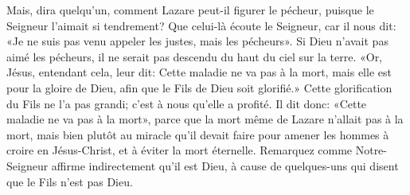 Mais, dira quelqu’un, comment Lazare peut-il figurer le pécheur,
	puisque le Seigneur l’aimait si tendrement?
Que celui-là écoute le Seigneur, car il nous dit:
	«Je ne suis pas venu appeler les justes, mais les pécheurs».
Si Dieu n’avait pas aimé les pécheurs,
	il ne serait pas descendu du haut du ciel sur la terre.
«Or, Jésus, entendant cela, leur dit:
	Cette maladie ne va pas à la mort, mais elle est pour la gloire de Dieu,
	afin que le Fils de Dieu soit glorifié.»
Cette glorification du Fils ne l’a pas grandi;
	c’est à nous qu’elle a profité.
Il dit donc: «Cette maladie ne va pas à la mort»,
	parce que la mort même de Lazare n’allait pas à la mort,
	mais bien plutôt au miracle qu’il devait faire
		pour amener les hommes à croire en Jésus-Christ,
	et à éviter la mort éternelle.
Remarquez comme Notre-Seigneur affirme indirectement qu’il est Dieu,
	à cause de quelques-uns qui disent que le Fils n’est pas Dieu.

